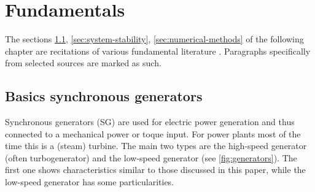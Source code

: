 
\chapter{Fundamentals}
\label{chap:fundamentals}

The sections \ref{sec:basics-sg}, \ref{sec:system-stability}, \ref{sec:numerical-methods} of the following chapter are recitations of various fundamental literature \autocite{oedingElektrischeKraftwerkeUnd2016,schwabElektroenergiesystemeSmarteStromversorgung2022,georgievNumericalAnalysisTime2022,milesNumericalMethodsPython2023,langtangenPrimerScientificProgramming2016,machowskiPowerSystemDynamics2020,kundurPowerSystemStability2022}. Paragraphs specifically from selected sources are marked as such. 


\section{Basics synchronous generators}
\label{sec:basics-sg}

Synchronous generators (\acs{SG}) are used for electric power generation and thus connected to a mechanical power or toque input. For power plants most of the time this is a (steam) turbine. The main two types are the high-speed generator (often turbogenerator) and the low-speed generator (see \autoref{fig:generators}). The first one shows characteristics similar to those discussed in this paper, while the low-speed generator has some particularities. \autocite{machowskiPowerSystemDynamics2020,oedingElektrischeKraftwerkeUnd2016}

